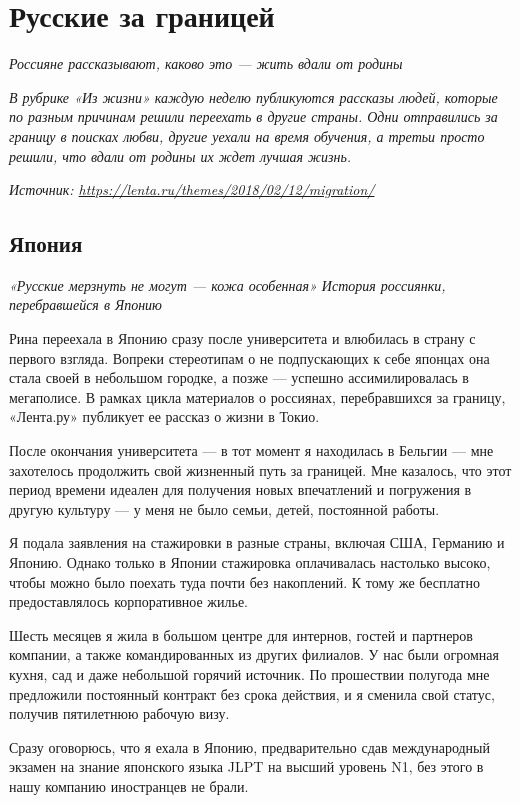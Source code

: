 \chapter{Русские за границей}

\textit{Россияне рассказывают, каково это — жить вдали от родины}

{
    \it В рубрике «Из жизни» каждую неделю публикуются рассказы людей, которые по разным причинам решили переехать в другие страны. Одни отправились за границу в поисках любви, другие уехали на время обучения, а третьи просто решили, что вдали от родины их ждет лучшая жизнь.
}

\textit{Источник: \url{https://lenta.ru/themes/2018/02/12/migration/}}

\section{Япония}

\textit{«Русские мерзнуть не могут — кожа особенная» История россиянки, перебравшейся в Японию}

Рина переехала в Японию сразу после университета и влюбилась в страну с первого взгляда. Вопреки стереотипам о не подпускающих к себе японцах она стала своей в небольшом городке, а позже — успешно ассимилировалась в мегаполисе. В рамках цикла материалов о россиянах, перебравшихся за границу, «Лента.ру» публикует ее рассказ о жизни в Токио.

После окончания университета — в тот момент я находилась в Бельгии — мне захотелось продолжить свой жизненный путь за границей. Мне казалось, что этот период времени идеален для получения новых впечатлений и погружения в другую культуру — у меня не было семьи, детей, постоянной работы.

Я подала заявления на стажировки в разные страны, включая США, Германию и Японию. Однако только в Японии стажировка оплачивалась настолько высоко, чтобы можно было поехать туда почти без накоплений. К тому же бесплатно предоставлялось корпоративное жилье.

Шесть месяцев я жила в большом центре для интернов, гостей и партнеров компании, а также командированных из других филиалов. У нас были огромная кухня, сад и даже небольшой горячий источник. По прошествии полугода мне предложили постоянный контракт без срока действия, и я сменила свой статус, получив пятилетнюю рабочую визу.

Сразу оговорюсь, что я ехала в Японию, предварительно сдав международный экзамен на знание японского языка JLPT на высший уровень N1, без этого в нашу компанию иностранцев не брали.

